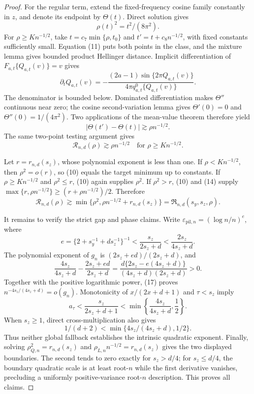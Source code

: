 \documentclass{article}
\begin{document}
\begin{proof}
For the regular term, extend the fixed-frequency cosine family constantly in \(z\), and denote its endpoint by \(\Theta(t)\).  Direct solution gives
\[
\rho(t)^2=t^2/(8\pi^2). \tag{11}
\]
For \(\rho\ge K n^{-1/2}\), take \(t=c_7\min\{\rho,t_0\}\) and \(t'=t+c_8n^{-1/2}\), with fixed constants sufficiently small.  Equation (11) puts both points in the class, and the mixture lemma gives bounded product Hellinger distance.  Implicit differentiation of \(F_{a,t}\{Q_{a,t}(v)\}=v\) gives
\[
\partial_tQ_{a,t}(v)
=-\frac{(2a-1)\sin\{2\pi Q_{a,t}(v)\}}
{4\pi q_{a,t}^{0}\{Q_{a,t}(v)\}}. \tag{12}
\]
The denominator is bounded below.  Dominated differentiation makes \(\Theta''\) continuous near zero; the cosine second-variation lemma gives \(\Theta'(0)=0\) and \(\Theta''(0)=1/(4\pi^2)\).  Two applications of the mean-value theorem therefore yield
\[
|\Theta(t')-\Theta(t)|\gtrsim\rho n^{-1/2}. \tag{13}
\]
The same two-point testing argument gives
\[
\mathcal R_{n,d}(\rho)\gtrsim\rho n^{-1/2}
\quad\text{for }\rho\ge K n^{-1/2}. \tag{14}
\]

Let \(r=r_{n,d}(s_z)\), whose polynomial exponent is less than one.  If \(\rho<K n^{-1/2}\), then \(\rho^2=o(r)\), so (10) equals the target minimum up to constants.  If \(\rho\ge K n^{-1/2}\) and \(\rho^2\le r\), (10) again supplies \(\rho^2\).  If \(\rho^2>r\), (10) and (14) supply \(\max\{r,\rho n^{-1/2}\}\ge(r+\rho n^{-1/2})/2\).  Therefore
\[
\mathcal R_{n,d}(\rho)\gtrsim
\min\{\rho^2,\rho n^{-1/2}+r_{n,d}(s_z)\}
=\mathfrak R_{n,d}(s_y,s_z,\rho). \tag{15}
\]

It remains to verify the strict gap and phase claims.  Write \(\varepsilon_{\mathrm{pil},n}=(\log n/n)^e\), where
\[
e=\{2+s_y^{-1}+ds_z^{-1}\}^{-1}
<\frac{s_z}{2s_z+d}<\frac{2s_z}{4s_z+d}. \tag{16}
\]
The polynomial exponent of \(g_n\) is \((2s_z+ed)/(2s_z+d)\), and
\[
\frac{4s_z}{4s_z+d}-\frac{2s_z+ed}{2s_z+d}
=\frac{d\{2s_z-e(4s_z+d)\}}{(4s_z+d)(2s_z+d)}>0. \tag{17}
\]
Together with the positive logarithmic power, (17) proves \(n^{-4s_z/(4s_z+d)}=o(g_n)\).  Monotonicity of \(x/(2x+d+1)\) and \(\tau<s_z\) imply
\[
a_\tau<\frac{s_z}{2s_z+d+1}<
\min\left\{\frac{4s_z}{4s_z+d},\frac12\right\}. \tag{18}
\]
When \(s_z\ge1\), direct cross-multiplication also gives
\[
1/(d+2)<\min\{4s_z/(4s_z+d),1/2\}. \tag{19}
\]
Thus neither global fallback establishes the intrinsic quadratic exponent.  Finally, solving \(\rho_{Q,n}^2=r_{n,d}(s_z)\) and \(\rho_{L,n}n^{-1/2}=r_{n,d}(s_z)\) gives the two displayed boundaries.  The second tends to zero exactly for \(s_z>d/4\); for \(s_z\le d/4\), the boundary quadratic scale is at least root-\(n\) while the first derivative vanishes, precluding a uniformly positive-variance root-\(n\) description.  This proves all claims.
\end{proof}
\end{document}
